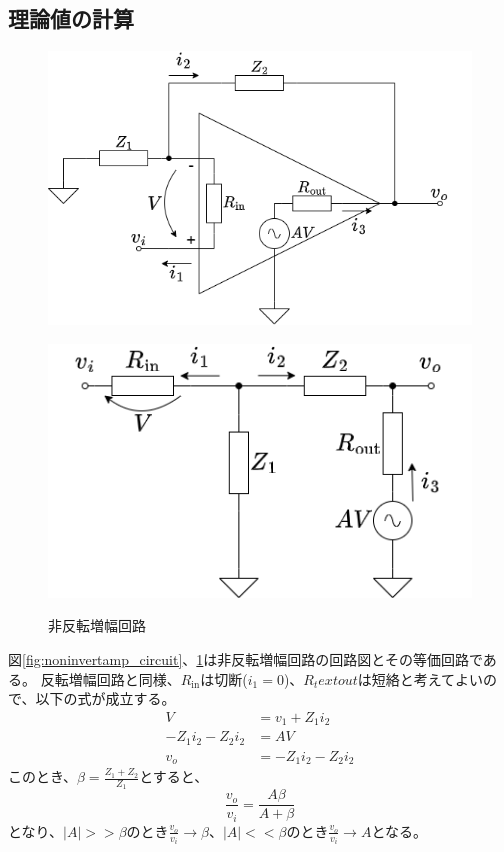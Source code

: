 \documentclass[a4paper]{ltjsarticle}
\begin{document}
\subsection{理論値の計算}
\begin{figure}[hbp]
    \centering
    \begin{minipage}{0.48\columnwidth}
        \centering
        \includegraphics[width=0.95\columnwidth]{./images/noninvertamp.png}
        \label{fig:noninvertamp_circuit}
    \end{minipage}
    \begin{minipage}{0.48\columnwidth}
        \centering
        \includegraphics[width=0.95\columnwidth]{./images/noninvertamp_c.png}
        \label{fig:noninvertamp_eqcircuit}
    \end{minipage}
    \caption{非反転増幅回路}
\end{figure}
図\ref{fig:noninvertamp_circuit}、\ref{fig:noninvertamp_eqcircuit}は非反転増幅回路の回路図とその等価回路である。
反転増幅回路と同様、$R_\text{in}$は切断($i_1=0$)、$R_text{out}$は短絡と考えてよいので、以下の式が成立する。
\begin{align}
    V &= v_1 + Z_1i_2 \\
    -Z_1i_2 - Z_2i_2 &= AV \\
    v_o &= -Z_1i_2 - Z_2i_2
\end{align}
このとき、$\beta=\frac{Z_1+Z_2}{Z_1}$とすると、
\begin{equation}
    \frac{v_o}{v_i} = \frac{A\beta}{A + \beta}
\end{equation}
となり、$|A|>>\beta$のとき$\frac{v_o}{v_i}\rightarrow\beta$、$|A|<<\beta$のとき$\frac{v_o}{v_i}\rightarrow A$となる。
\end{document}
